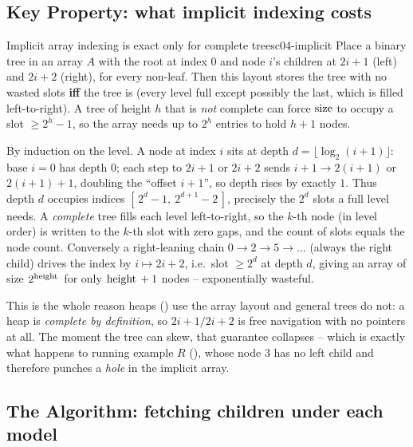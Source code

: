 \subsection{Key Property: what implicit indexing costs}

\begin{theorem}{Implicit array indexing is exact only for complete trees}{c04-implicit}
Place a binary tree in an array $A$ with the root at index $0$ and node $i$'s
children at $2i+1$ (left) and $2i+2$ (right), for every non-leaf. Then this layout stores
the tree with no wasted slots \textbf{iff} the tree is  (every level full
except possibly the last, which is filled left-to-right). A tree of height $h$ that is
\emph{not} complete can force $\operatorname{size}$ to occupy a slot $\ge 2^{h}-1$, so the array needs
up to $2^{h}$ entries to hold $h{+}1$ nodes.
\end{theorem}
\begin{proofbox}
By induction on the level. A node at index $i$ sits at depth $d=\lfloor\log_2(i+1)\rfloor$:
base $i=0$ has depth $0$; each step to $2i{+}1$ or $2i{+}2$ sends $i+1 \to 2(i+1)$ or
$2(i+1)+1$, doubling the ``offset $i{+}1$'', so depth rises by exactly $1$. Thus depth $d$
occupies indices $[\,2^{d}-1,\ 2^{d+1}-2\,]$, precisely the $2^{d}$ slots a full level
needs. A \emph{complete} tree fills each level left-to-right, so the $k$-th node (in
level order) is written to the $k$-th slot with zero gaps, and the count of slots equals
the node count. Conversely a right-leaning chain $0\to 2\to 5\to\dots$ (always the right
child) drives the index by $i\mapsto 2i+2$, i.e.\ slot $\ge 2^{d}$ at depth $d$, giving an
array of size $2^{\operatorname{height}{}}$ for only $\operatorname{height}{}+1$ nodes -- exponentially wasteful.
\end{proofbox}
\begin{insightbox}
This is the whole reason heaps () use the array layout and general trees do
not: a heap is \emph{complete by definition}, so $2i{+}1/2i{+}2$ is free navigation with
no pointers at all. The moment the tree can skew, that guarantee collapses -- which is
exactly what happens to running example $R$ (), whose node $3$ has
no left child and therefore punches a \emph{hole} in the implicit array.
\end{insightbox}

\subsection{The Algorithm: fetching children under each model}

